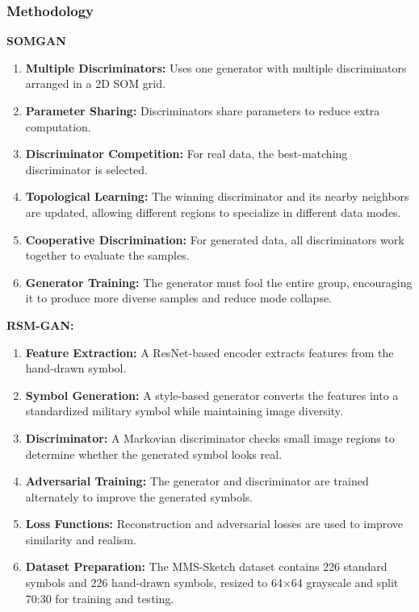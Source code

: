 \documentclass[12pt,a4paper]{article}
\begin{document}
\subsubsection{Methodology}
\textbf{SOMGAN}
\begin{enumerate}
    \item \textbf{Multiple Discriminators:} Uses one generator with multiple discriminators arranged in a 2D SOM grid.
    \item \textbf{Parameter Sharing:} Discriminators share parameters to reduce extra computation.
    \item \textbf{Discriminator Competition:} For real data, the best-matching discriminator is selected.
    \item \textbf{Topological Learning:} The winning discriminator and its nearby neighbors are updated, allowing different regions to specialize in different data modes.
    \item \textbf{Cooperative Discrimination:} For generated data, all discriminators work together to evaluate the samples.
    \item \textbf{Generator Training:} The generator must fool the entire group, encouraging it to produce more diverse samples and reduce mode collapse.
\end{enumerate}
\textbf{RSM-GAN:}
\begin{enumerate}
    \item \textbf{Feature Extraction:} A ResNet-based encoder extracts features from the hand-drawn symbol.
    \item \textbf{Symbol Generation:} A style-based generator converts the features into a standardized military symbol while maintaining image diversity.
    \item \textbf{Discriminator:} A Markovian discriminator checks small image regions to determine whether the generated symbol looks real.
    \item \textbf{Adversarial Training:} The generator and discriminator are trained alternately to improve the generated symbols.
    \item \textbf{Loss Functions:} Reconstruction and adversarial losses are used to improve similarity and realism.
    \item \textbf{Dataset Preparation:} The MMS-Sketch dataset contains 226 standard symbols and 226 hand-drawn symbols, resized to 64×64 grayscale and split 70:30 for training and testing.
\end{enumerate}
 
\end{document}
